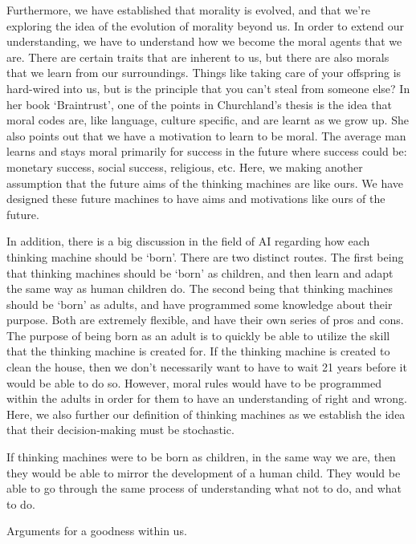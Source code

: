 \documentclass[11pt, oneside]{article}
\begin{document}
\par Furthermore, we have established that morality is evolved, and that we're exploring the idea of the evolution of morality beyond us. In order to extend our understanding, we have to understand how we become the moral agents that we are. There are certain traits that are inherent to us, but there are also morals that we learn from our surroundings. Things like taking care of your offspring is hard-wired into us, but is the principle that you can't steal from someone else? In her book `Braintrust', one of the points in Churchland's thesis is the idea that moral codes are, like language, culture specific, and are learnt as we grow up. She also points out that we have a motivation to learn to be moral. The average man learns and stays moral primarily for success in the future where success could be: monetary success, social success, religious, etc. Here, we making another assumption that the future aims of the thinking machines are like ours. We have designed these future machines to have aims and motivations like ours of the future.

\par In addition, there is a big discussion in the field of AI regarding how each thinking machine should be `born'. There are two distinct routes. The first being that thinking machines should be `born' as children, and then learn and adapt the same way as human children do. The second being that thinking machines should be `born' as adults, and have programmed some knowledge about their purpose. Both are extremely flexible, and have their own series of pros and cons. The purpose of being born as an adult is to quickly be able to utilize the skill that the thinking machine is created for. If the thinking machine is created to clean the house, then we don't necessarily want to have to wait 21 years before it would be able to do so. However, moral rules would have to be programmed within the adults in order for them to have an understanding of right and wrong. Here, we also further our definition of thinking machines as we establish the idea that their decision-making must be stochastic. 

\par If thinking machines were to be born as children, in the same way we are, then they would be able to mirror the development of a human child. They would be able to go through the same process of understanding what not to do, and what to do. 

\par Arguments for a goodness within us. 
\end{document}
